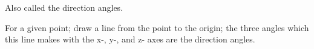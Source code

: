 Also called the direction angles. 
\par
For a given point; draw a line from the point to the origin; the three angles
which this line makes with the x-, y-, and z- axes are the direction angles.